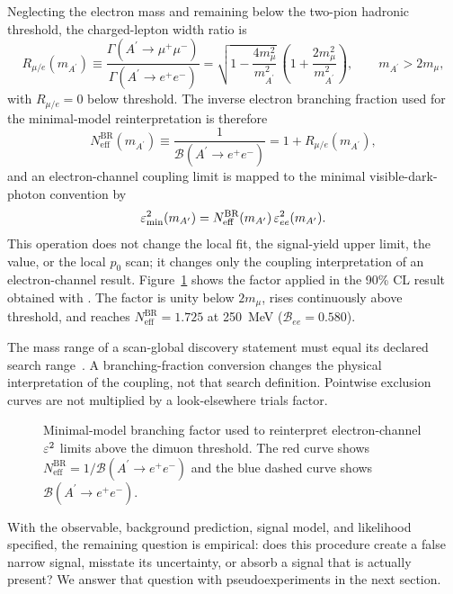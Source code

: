 Neglecting the electron mass and remaining below the two-pion hadronic threshold, the
charged-lepton width ratio is
\begin{equation}
R_{\mu/e}(m_{A^\prime})
\equiv
\frac{\Gamma(A^\prime\to\mu^+\mu^-)}
{\Gamma(A^\prime\to e^+e^-)}
=
\sqrt{1-\frac{4m_\mu^2}{m_{A^\prime}^2}}\,
\left(1+\frac{2m_\mu^2}{m_{A^\prime}^2}\right),
\qquad m_{A^\prime}>2m_\mu,
\label{eq:dimuon-width-ratio}
\end{equation}
with $R_{\mu/e}=0$ below threshold. The inverse electron branching fraction used for
the minimal-model reinterpretation is therefore
\begin{equation}
N_{\mathrm{eff}}^{\mathrm{BR}}(m_{A^\prime})
\equiv
\frac{1}{\mathcal{B}(A^\prime\to e^+e^-)}
=
1+R_{\mu/e}(m_{A^\prime}),
\label{eq:dimuon-neff}
\end{equation}
and an electron-channel coupling limit is mapped to the minimal visible-dark-photon
convention by
\begin{equation}
\varepsilon^2_{\mathrm{min}}(m_{A^\prime})
=
N_{\mathrm{eff}}^{\mathrm{BR}}(m_{A^\prime})\,\varepsilon^2_{ee}(m_{A^\prime}).
\label{eq:dimuon-eps2-map}
\end{equation}
This operation does not change the local fit, the signal-yield upper limit, the
\CLs{} value, or the local $p_0$ scan; it changes only the coupling interpretation of
an electron-channel result. Figure~\ref{fig:methodology-dimuon-factor} shows the
factor applied in the 90\% CL result obtained with \CLs{}. The factor is unity below
$2m_\mu$, rises continuously above threshold, and reaches
$N_{\mathrm{eff}}^{\mathrm{BR}}=1.725$ at \SI{250}{MeV}
($\mathcal{B}_{ee}=0.580$).

The mass range of a scan-global discovery statement must equal its declared
search range~\cite{GrossVitells2010}. A branching-fraction conversion changes the
physical interpretation of the coupling, not that search definition. Pointwise
\CLs{} exclusion curves are not multiplied by a look-elsewhere trials factor.

\begin{figure}[H]
\centering
{}
\caption{Minimal-model branching factor used to reinterpret electron-channel
$\varepsilon^2$ limits above the dimuon threshold. The red curve shows
$N_{\mathrm{eff}}^{\mathrm{BR}}=1/\mathcal{B}(A^\prime\to e^+e^-)$ and the blue dashed
curve shows $\mathcal{B}(A^\prime\to e^+e^-)$.}
\label{fig:methodology-dimuon-factor}
\end{figure}

With the observable, background prediction, signal model, and likelihood specified,
the remaining question is empirical: does this procedure create a false narrow signal,
misstate its uncertainty, or absorb a signal that is actually present? We answer that
question with pseudoexperiments in the next section.

